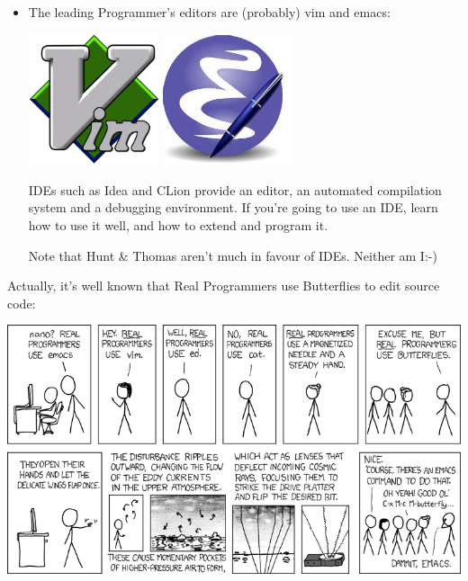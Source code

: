\documentclass[handout]{beamer}
\begin{document}
\begin{frame}
  \begin{itemize}
    \item
       The leading Programmer's editors are (probably) \alert{vim} and \alert{emacs}:

\includegraphics[width=0.3\textwidth]{vimLogo}
\includegraphics[width=0.3\textwidth]{emacsLogo}

    \pitem IDEs such as \alert{Idea} and \alert{CLion}
          provide an editor, an automated compilation system
	  and a debugging environment.
	  If you're going to use an IDE,
          learn how to use it well, and
          how to extend and program it.

     \pitem
     Note that \alert{Hunt \& Thomas} aren't much in favour of
     IDEs.  Neither am I:-)
  \end{itemize}
\end{frame}

\begin{frame}
Actually, it's well known that \alert{Real Programmers use Butterflies}
to edit source code:

\centering
\vspace{10pt}
\includegraphics[height=0.8\textheight]{real_programmers.png}

\end{frame}
\end{document}
